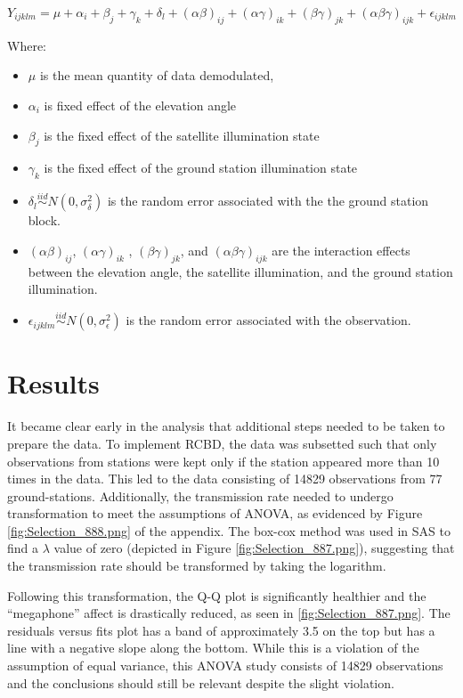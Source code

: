 \documentclass[oneside,a4paper,12pt]{book}
\begin{document}
$$
Y_{ijklm} = \mu  + \alpha_i + \beta_j  + \gamma_k + \delta_l + (\alpha\beta)_{ij} + (\alpha\gamma)_{ik} + (\beta\gamma)_{jk} + (\alpha\beta\gamma)_{ijk}  + \epsilon_{ijklm}
$$

Where:

\begin{itemize}
\item $\mu$ is the mean quantity of data demodulated,
\item $\alpha_i$ is fixed effect of the elevation angle
\item  $\beta_j$ is the fixed effect of the satellite illumination state
\item $\gamma_k$ is the fixed effect of the ground station illumination state
\item $\delta_l\overset{iid}{\sim} N(0, \sigma^2_\delta)$ is the random error associated with the the ground station block.
\item $(\alpha\beta)_{ij}$, $ (\alpha\gamma)_{ik}$ , $(\beta\gamma)_{jk}$,  and $ (\alpha\beta\gamma)_{ijk} $ are the interaction effects between the elevation angle, the satellite illumination, and the ground station illumination.
\item $\epsilon_{ijklm} \overset{iid}{\sim} N(0, \sigma^2_\epsilon)$ is the random error associated with the observation.
\end{itemize}

\section*{Results }

It became clear early in the analysis that additional steps needed to be taken to prepare the data. To implement RCBD, the data was subsetted such that only observations from stations were kept only if the station appeared more than 10 times in the data. This led to the data consisting of 14829 observations from 77 ground-stations. Additionally,  the transmission rate needed to undergo transformation to meet the assumptions of ANOVA, as evidenced by  Figure \ref{fig:Selection_888.png} of the appendix. The box-cox method was used in SAS to find a $\lambda$ value of zero (depicted in  Figure \ref{fig:Selection_887.png}), suggesting that the transmission rate should be transformed by taking the logarithm. 

Following this transformation, the Q-Q plot is significantly healthier and the ``megaphone'' affect is drastically reduced,  as seen in \ref{fig:Selection_887.png}. The residuals versus fits plot has a band of approximately 3.5 on the top but has a line with a negative slope along the bottom. While this is a violation of the assumption of equal variance, this ANOVA study consists of 14829 observations and the conclusions should still be relevant despite the slight violation.
\end{document}
